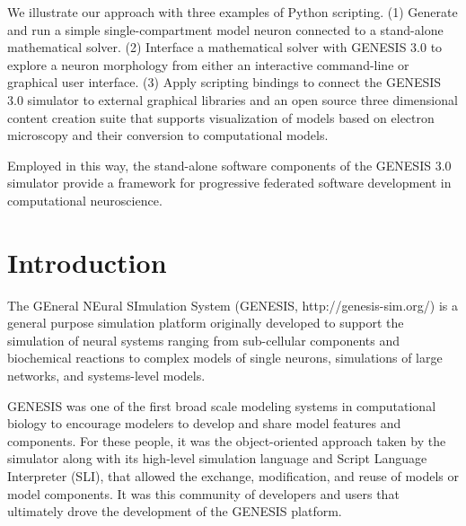 \documentclass[10pt]{article}
\begin{document}
We illustrate our approach with three examples of Python scripting. 
(1) Generate and run a simple single-compartment model neuron connected to a 
stand-alone mathematical solver. (2) Interface a mathematical solver with GENESIS 3.0 to explore a neuron morphology from either
an interactive command-line or graphical user interface.
(3) Apply scripting bindings to connect the GENESIS 3.0 simulator to
external graphical libraries and an open source three dimensional content creation
suite that supports visualization of models based on electron
microscopy and their conversion to computational
models.

Employed in this way, the stand-alone software components of the GENESIS 3.0 
simulator provide a framework for progressive federated
software development in computational neuroscience.


\section*{Introduction}

The GEneral NEural SImulation System (GENESIS,
http://genesis-sim.org/) is a general purpose simulation platform originally
developed to support the simulation of neural systems ranging from
sub-cellular components and biochemical reactions to complex models of
single neurons, simulations of large networks, and systems-level
models.

GENESIS was one of the first broad scale modeling systems in
computational biology to encourage modelers to develop and share model
features and components. For these people, it was the object-oriented
approach taken by the simulator along with its high-level simulation
language and Script Language Interpreter (SLI), that allowed the exchange, modification, and reuse of models
or model components.  It was this community of developers and
 users that ultimately drove the development of the GENESIS platform.
 
\end{document}
